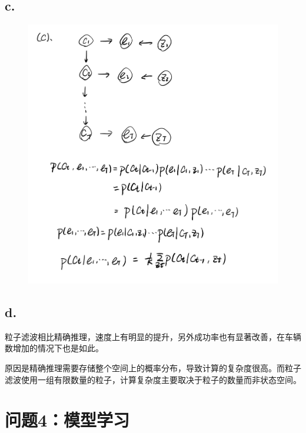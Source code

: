\documentclass{article}
\begin{document}
\subsection*{c.}
\begin{figure}[H]
    \centering
    \includegraphics[scale=0.5]{3c.png}
\end{figure}
\subsection*{d.}
粒子滤波相比精确推理，速度上有明显的提升，另外成功率也有显著改善，在车辆数增加的情况下也是如此。

原因是精确推理需要存储整个空间上的概率分布，导致计算的复杂度很高。而粒子滤波使用一组有限数量的粒子，计算复杂度主要取决于粒子的数量而非状态空间。
\section*{问题4：模型学习}
\end{document}
